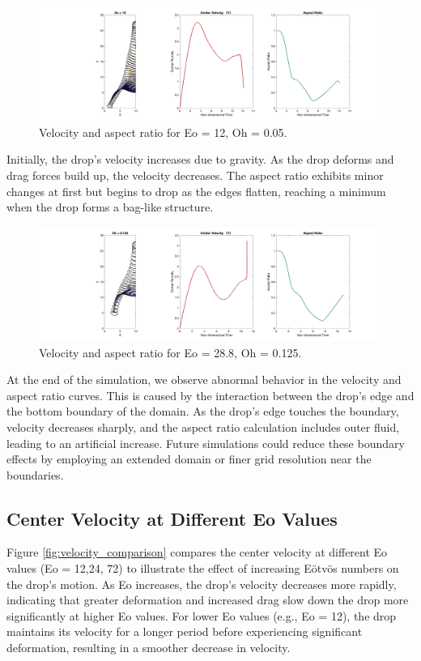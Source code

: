 \documentclass[12pt]{article}
\begin{document}
\begin{figure}[H]
    \centering
    \includegraphics[width=\textwidth]{figures/All_Eo=12__t=0.28.png}
    \caption{Velocity and aspect ratio for Eo = 12, Oh = 0.05.}
    \label{fig:velocity_aspect}
\end{figure}

Initially, the drop's velocity increases due to gravity. As the drop deforms and drag forces build up, the velocity decreases. The aspect ratio exhibits minor changes at first but begins to drop as the edges flatten, reaching a minimum when the drop forms a bag-like structure.

\begin{figure}[H]
    \centering
    \includegraphics[width=\textwidth]{Latex/figures/All_Oh=1.25_t=0.44.png}
    \caption{Velocity and aspect ratio for Eo = 28.8, Oh = 0.125.}
    \label{fig:velocity_aspect}
\end{figure}

At the end of the simulation, we observe abnormal behavior in the velocity and aspect ratio curves. This is caused by the interaction between the drop's edge and the bottom boundary of the domain. As the drop's edge touches the boundary, velocity decreases sharply, and the aspect ratio calculation includes outer fluid, leading to an artificial increase. Future simulations could reduce these boundary effects by employing an extended domain or finer grid resolution near the boundaries.





\subsection{Center Velocity at Different Eo Values}
Figure \ref{fig:velocity_comparison} compares the center velocity at different Eo values (Eo = 12,24, 72) to illustrate the effect of increasing Eötvös numbers on the drop’s motion. As Eo increases, the drop's velocity decreases more rapidly, indicating that greater deformation and increased drag slow down the drop more significantly at higher Eo values. For lower Eo values (e.g., Eo = 12), the drop maintains its velocity for a longer period before experiencing significant deformation, resulting in a smoother decrease in velocity.
\end{document}
